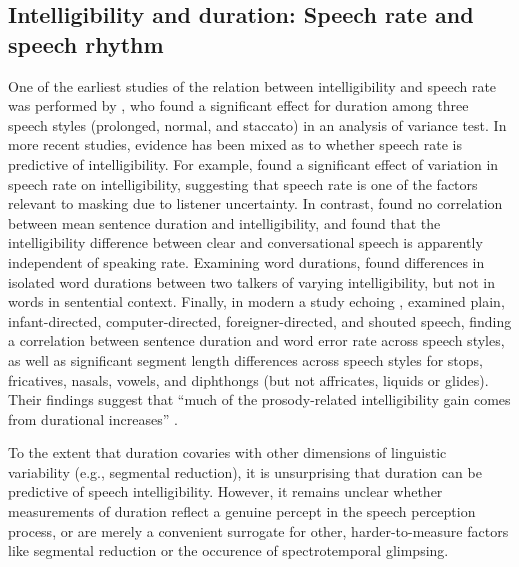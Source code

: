 \subsection[Intelligibility and duration]{Intelligibility and duration: Speech rate and speech rhythm}
One of the earliest studies of the relation between intelligibility and speech rate was performed by \citet{Tolhurst1957a}, who found a significant effect for duration among three speech styles (prolonged, normal, and staccato) in an analysis of variance test.  In more recent studies, evidence has been mixed as to whether speech rate is predictive of intelligibility.  For example, \citet{SommersEtAl1994} found a significant effect of variation in speech rate on intelligibility, suggesting that speech rate is one of the factors relevant to masking due to listener uncertainty.  In contrast, \citet{BradlowEtAl1996} found no correlation between mean sentence duration and intelligibility, and \citet{KrauseBraida2002} found that the intelligibility difference between clear and conversational speech is apparently independent of speaking rate.  Examining word durations, \citet{BondMoore1994} found differences in isolated word durations between two talkers of varying intelligibility, but not in words in sentential context.  Finally, in modern a study echoing \citet{Tolhurst1957a}, \citet{MayoEtAl2012} examined plain, infant-directed, computer-directed, foreigner-directed, and shouted speech, finding a correlation between sentence duration and word error rate across speech styles, as well as significant segment length differences across speech styles for stops, fricatives, nasals, vowels, and diphthongs (but not affricates, liquids or glides).  Their findings suggest that “much of the prosody-related intelligibility gain comes from durational increases” \citep{MayoEtAl2012}.

To the extent that duration covaries with other dimensions of linguistic variability (e.g., segmental reduction), it is unsurprising that duration can be predictive of speech intelligibility.  However, it remains unclear whether measurements of duration reflect a genuine percept in the speech perception process, or are merely a convenient surrogate for other, harder-to-measure factors like segmental reduction or the occurence of spectrotemporal glimpsing.

